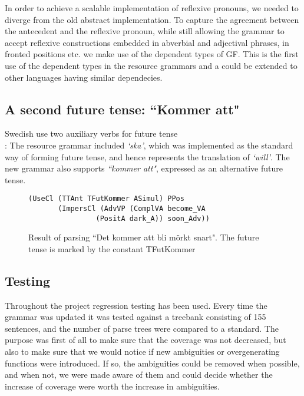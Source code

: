 \documentclass[10pt, a4paper]{article}
\begin{document}
In order to achieve a scalable implementation of reflexive pronouns, we needed
to diverge from the old abstract implementation. To capture the agreement
between the antecedent and the reflexive pronoun, while still allowing the grammar
to accept reflexive constructions embedded in abverbial and adjectival phrases,
in fronted positions etc. we make use of the dependent types of GF. This is the
first use of the dependent types in the resource grammars and a could be
extended to other languages having similar dependecies.

\subsection{A second future tense: ``Kommer att"}
Swedish use two auxiliary verbs for future tense \\
\cite[p. 246]{H&H}:
The resource grammar included 
\emph{`ska'}, which was implemented as the standard way of forming future
tense, and hence represents the translation of
\emph{`will'}. 
The new grammar also supports \emph{``kommer att"}, expressed as an alternative
future tense.
\begin{figure}[h]
\begin{verbatim}
(UseCl (TTAnt TFutKommer ASimul) PPos 
       (ImpersCl (AdvVP (ComplVA become_VA 
                (PositA dark_A)) soon_Adv))
\end{verbatim}
\caption{Result of parsing ``Det kommer att bli m{\"o}rkt snart". The future tense
         is marked by the constant TFutKommer}
  \label{fig:kommeratt}
\end{figure}

\subsection{Testing}
Throughout the project regression testing has been used. Every time the grammar was updated
it was tested against a treebank consisting of 155 sentences, and the number of
parse trees were compared to a standard.
The purpose was first of all to
make sure that the coverage was not decreased, but also to make sure that we
would notice if new ambiguities or overgenerating functions were introduced.
If so, the ambiguities could be removed when possible, and when not, we were made
aware of them and could decide whether the increase of coverage were worth the
increase in ambiguities.
\end{document}
